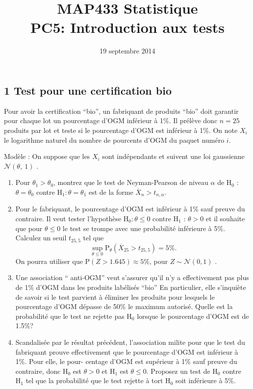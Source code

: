 \documentclass[a4paper,10pt]{article}
\begin{document}
\title{{\bf MAP433 Statistique}\\
{\bf PC5: Introduction aux tests}}

\date{19 septembre 2014}
\maketitle

\subsection*{1 Test pour une certification bio}

Pour avoir la certification ``bio'', un fabriquant de produits ``bio'' doit garantir pour chaque lot un pourcentage d'OGM inf\'{e}rieur \`{a} 1\%. Il pr\'{e}l\`{e}ve donc $n=25$ produits par lot et teste si le pourcentage d'OGM est inf\'{e}rieur \`{a} 1\%. On note $X_{i}$ le logarithme naturel du nombre de pourcents d'OGM du paquet num\'{e}ro $i.$

Mod\`{e}le : On suppose que les $X_{i}$ sont ind\'{e}pendants et suivent une loi gaussienne $\mathcal{N}(\theta,\ 1)$ . 
\begin{enumerate}
\item Pour $\theta_{1}>\theta_{0}$, montrez que le test de Neyman-Pearson de niveau $\alpha$ de $\mathrm{H}_{0}$ : $\theta=\theta_{0}$ contre $\mathrm{H}_{1}:\theta=\theta_{1}$ est de la forme $\overline{X}_{n}>t_{n,\alpha}.$
\item Pour le fabriquant, le pourcentage d'OGM est inf\'{e}rieur \`{a} 1\% sauf preuve du contraire. Il veut tester l'hypoth\`{e}se $\mathrm{H}_{0}:\theta\leq 0$ contre $\mathrm{H}_{1}$ : $\theta>0$ et il souhaite que pour $\theta\leq 0$ le test se trompe avec une probabilit\'{e} inf\'{e}rieure \`{a} 5\%. Calculez un seuil $t_{25,5}$ tel que
$$
\sup_{\theta\leq 0}\mathrm{P}_{\theta}(\overline{X}_{25}>t_{25,5})=5\%.
$$
On pourra utiliser que $\mathrm{P}(Z>1.645)\approx 5\%$, pour $Z\sim \mathcal{N}(0,1)$ .
\item Une association `` anti-OGM'' veut s'assurer qu'il n'y a effectivement pas plus de 1\% d'OGM dans les produits lab\'{e}lis\'{e}s ``bio'' En particulier, elle s'inqui\`{e}te de savoir si le test parvient \`{a} \'{e}liminer les produits pour lesquels le pourcentage d'OGM d\'{e}passe de 50\% le maximum autoris\'{e}. Quelle est la probabilit\'{e} que le test ne rejette pas $\mathrm{H}_{0}$ lorsque le pourcentage d'OGM est de 1.5\%?
\item Scandalis\'{e}e par le r\'{e}sultat pr\'{e}c\'{e}dent, l'association milite pour que le test du fabriquant prouve effectivement que le pourcentage d'OGM est inf\'{e}rieur \`{a} 1\%. Pour elle, le pour- centage d'OGM est sup\'{e}rieur \`{a} 1\% sauf preuve du contraire, donc $\mathrm{H}_{0}$ est $\theta>0$ et $\mathrm{H}_{1}$ est $\theta\leq 0$. Proposez un test de $\mathrm{H}_{0}$ contre $\mathrm{H}_{1}$ tel que la probabilit\'{e} que le test rejette \`{a} tort $\mathrm{H}_{0}$ soit inf\'{e}rieure \`{a} 5\%.
\end{enumerate}
\end{document}
